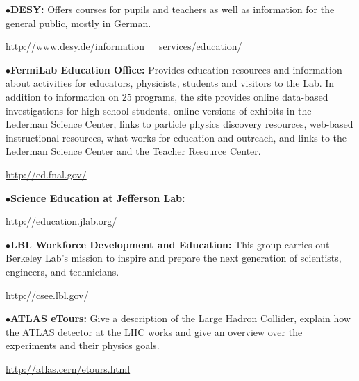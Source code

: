 \smallskip

\item{$\bullet$}{\bf DESY:}
Offers courses for pupils and teachers as well as information for the general public, mostly in German.
	\item{}\qquad\url{http://www.desy.de/information\_\_services/education/}

\smallskip

\item{$\bullet$}{\bf FermiLab Education Office:} 
Provides  education resources and information about activities for educators, physicists, students and visitors to the Lab. In addition to information on 25 programs, the site  provides online data-based investigations for high school students, online versions of exhibits in the Lederman Science Center, links to particle physics discovery resources, web-based instructional resources, what works for education and outreach, and links to the Lederman Science Center and the Teacher Resource Center.
	\item{}\qquad\url{http://ed.fnal.gov/}

\smallskip

\item{$\bullet$}{\bf Science Education at Jefferson Lab:} 
	\item{}\qquad\url{http://education.jlab.org/}

\smallskip

\item{$\bullet$}{\bf LBL Workforce Development and Education:} 
This group carries out Berkeley Lab’s mission to inspire and prepare the next generation of scientists, engineers, and technicians.
	\item{}\qquad\url{http://csee.lbl.gov/}

\medskip


\medskip



\medskip



\item{$\bullet$}{\bf ATLAS eTours:} 
Give a description of the Large Hadron Collider, explain how the ATLAS detector at the LHC works and give an overview over the experiments and their physics goals. 
	\item{}\qquad\url{http://atlas.cern/etours.html}

